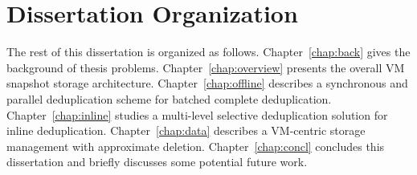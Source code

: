 \section{Dissertation Organization}
\label{intro:organ}
The rest of this dissertation is organized as follows.
Chapter~\ref{chap:back} gives the background of thesis problems.
Chapter~\ref{chap:overview} presents the overall VM snapshot storage architecture.
Chapter~\ref{chap:offline}  describes a synchronous and parallel deduplication scheme for batched complete deduplication.
Chapter~\ref{chap:inline} studies a multi-level selective deduplication solution for inline deduplication.
Chapter~\ref{chap:data}  describes a VM-centric storage management with approximate deletion.
Chapter~\ref{chap:concl}  concludes this  dissertation  and  briefly discusses some potential future work.

